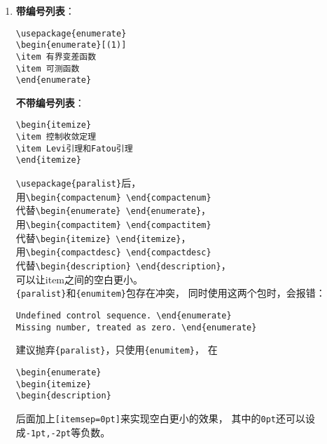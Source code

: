 \documentclass{article}
\begin{document}
\begin{multicols}{2}
\begin{enumerate}
\item \textbf{带编号列表}：
\begin{lstlisting}
\usepackage{enumerate}
\begin{enumerate}[(1)]
\item 有界变差函数
\item 可测函数
\end{enumerate}
\end{lstlisting} 
\textbf{不带编号列表}：
\begin{lstlisting}
\begin{itemize}
\item 控制收敛定理
\item Levi引理和Fatou引理
\end{itemize}
\end{lstlisting} 
\verb|\usepackage{paralist}|后，\\
用\verb|\begin{compactenum} \end{compactenum}|\\
代替\verb|\begin{enumerate} \end{enumerate}|，\\
用\verb|\begin{compactitem} \end{compactitem}|\\
代替\verb|\begin{itemize} \end{itemize}|，\\
用\verb|\begin{compactdesc} \end{compactdesc}|\\
代替\verb|\begin{description} \end{description}|，\\
可以让item之间的空白更小。\\
\verb|{paralist}|和\verb|{enumitem}|包存在冲突，
同时使用这两个包时，会报错：
\begin{lstlisting}
Undefined control sequence. \end{enumerate}
Missing number, treated as zero. \end{enumerate}   
\end{lstlisting} 
建议抛弃\verb|{paralist}|，只使用\verb|{enumitem}|，
在
\begin{lstlisting}
\begin{enumerate}
\begin{itemize}
\begin{description}     
\end{lstlisting} 
后面加上\verb|[itemsep=0pt]|来实现空白更小的效果，
其中的\verb|0pt|还可以设成\verb|-1pt,-2pt|等负数。


\end{enumerate}
\end{multicols}
\end{document}
